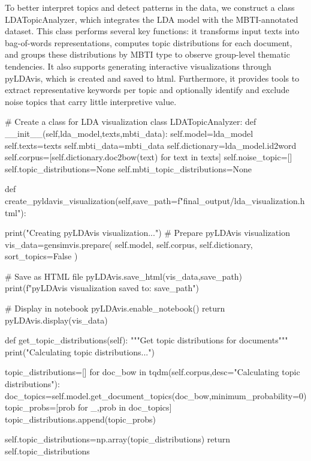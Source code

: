 \documentclass[12pt]{article}
\begin{document}
	To better interpret topics and detect patterns in the data, we construct a class LDATopicAnalyzer, which integrates the LDA model with the MBTI-annotated dataset. This class performs several key functions: it transforms input texts into bag-of-words representations, computes topic distributions for each document, and groups these distributions by MBTI type to observe group-level thematic tendencies. It also supports generating interactive visualizations through pyLDAvis, which is created and saved to html. Furthermore, it provides tools to extract representative keywords per topic and optionally identify and exclude noise topics that carry little interpretive value. 
	\begin{python}
# Create a class for LDA visualization
class LDATopicAnalyzer:
    def __init__(self,lda_model,texts,mbti_data):
        self.model=lda_model
        self.texts=texts
        self.mbti_data=mbti_data
        self.dictionary=lda_model.id2word
        self.corpus=[self.dictionary.doc2bow(text) for text in texts]
        self.noise_topic=[]
        self.topic_distributions=None
        self.mbti_topic_distributions=None
        
    def create_pyldavis_visualization(self,save_path=f"final_output/lda_visualization.html"):
        
        print("Creating pyLDAvis visualization...")
        # Prepare pyLDAvis visualization
        vis_data=gensimvis.prepare(
            self.model,
            self.corpus,
            self.dictionary,
            sort_topics=False
        )
        
        # Save as HTML file
        pyLDAvis.save_html(vis_data,save_path)
        print(f"pyLDAvis visualization saved to: {save_path}")
        
        # Display in notebook
        pyLDAvis.enable_notebook()
        return pyLDAvis.display(vis_data)
    
    def get_topic_distributions(self):
        """Get topic distributions for documents"""
        print("Calculating topic distributions...")
        
        topic_distributions=[]
        for doc_bow in tqdm(self.corpus,desc="Calculating topic distributions"):
            doc_topics=self.model.get_document_topics(doc_bow,minimum_probability=0)
            topic_probs=[prob for _,prob in doc_topics]
            topic_distributions.append(topic_probs)
        
        self.topic_distributions=np.array(topic_distributions)
        return self.topic_distributions
    

\end{python}
\end{document}
